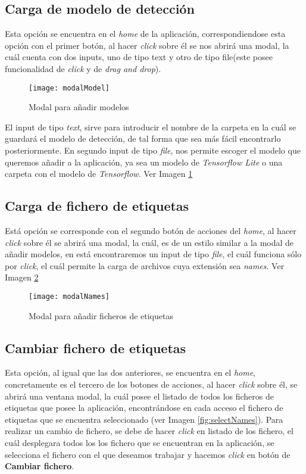 \subsection{Carga de modelo de detección}
Esta opción se encuentra en el \textit{home} de la aplicación, correspondiendose esta opción con el primer botón, al hacer \textit{click} sobre él se nos abrirá una modal, la cuál cuenta con dos inputs, uno de tipo text y otro de tipo file(este posee funcionalidad de \textit{click} y de \textit{drag and drop}).
\begin{figure}[!h]
    \centering
    \texttt{[image: modalModel]}
    \caption{Modal para añadir modelos}\label{fig:modalModel}
\end{figure}
El input de tipo \textit{text}, sirve para introducir el nombre de la carpeta en la cuál se guardará el modelo de detección, de tal forma que sea más fácil encontrarlo posteriormente.
En segundo input de tipo \textit{file}, nos permite escoger el modelo que queremos añadir a la aplicación, ya sea un modelo de \textit{Tensorflow Lite} o una carpeta con el modelo de \textit{Tensorflow}. Ver Imagen \ref{fig:modalModel}

\subsection{Carga de fichero de etiquetas}
Está opción se corresponde con el segundo botón de acciones del \textit{home}, al hacer \textit{click} sobre él se abrirá una modal, la cuál, es de un estilo similar a la modal de añadir modelos, en está encontraremos un input de tipo \textit{file}, el cuál funciona sólo por \textit{click}, el cuál permite la carga de archivos cuya extensión sea \textit{names}. Ver Imagen \ref{fig:modalNames}
\begin{figure}[!h]
    \centering
    \texttt{[image: modalNames]}
    \caption{Modal para añadir ficheros de etiquetas}\label{fig:modalNames}
\end{figure}

\subsection{Cambiar fichero de etiquetas} \label{Cambiar fichero de etiquetas}
Esta opción, al igual que las dos anteriores, se encuentra en el \textit{home}, concretamente es el tercero de los botones de acciones, al hacer \textit{click} sobre él, se abrirá una ventana modal, la cuál posee el listado de todos los ficheros de etiquetas que posee la aplicación, encontrándose en cada acceso el fichero de etiquetas que se encuentra seleccionado (ver Imagen \ref{fig:selectNames}).
Para realizar un cambio de fichero, se debe de hacer \textit{click} en listado de los fichero, el cuál desplegara todos los los fichero que se encuentran en la aplicación, se selecciona el fichero con el que deseamos trabajar y hacemos \textit{click} en botón de \textbf{Cambiar fichero}.

